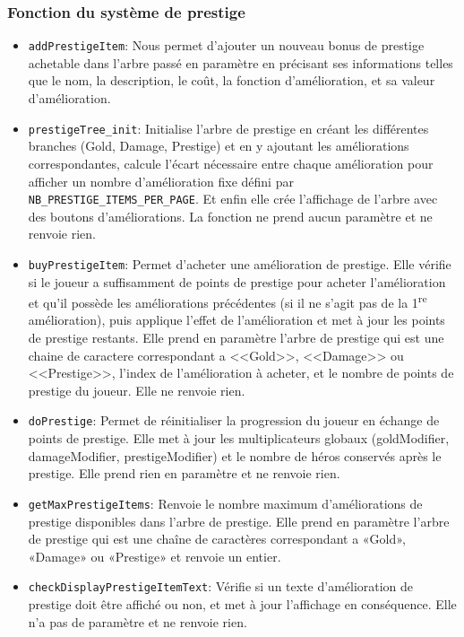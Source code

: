 \documentclass[11pt,a4paper]{article}
\begin{document}
\subsubsection{Fonction du système de prestige}
\begin{itemize}
    \item \texttt{addPrestigeItem}: Nous permet d’ajouter un nouveau bonus de prestige achetable dans l’arbre passé en paramètre en précisant ses informations telles que le nom, la description, le coût, la fonction d’amélioration, et sa valeur d’amélioration.
    \item \texttt{prestigeTree\_init}: Initialise l'arbre de prestige en créant les différentes branches (Gold, Damage, Prestige) et en y ajoutant les améliorations correspondantes, calcule l'écart nécessaire entre chaque amélioration pour afficher un nombre d'amélioration fixe défini par \\\texttt{NB\_PRESTIGE\_ITEMS\_PER\_PAGE}. Et enfin elle crée l’affichage de l’arbre avec des boutons d’améliorations. La fonction ne prend aucun paramètre et ne renvoie rien.
    \item \texttt{buyPrestigeItem}: Permet d'acheter une amélioration de prestige. Elle vérifie si le joueur a suffisamment de points de prestige pour acheter l'amélioration et qu'il possède les améliorations précédentes (si il ne s’agit pas de la 1\textsuperscript{re} amélioration), puis applique l'effet de l'amélioration et met à jour les points de prestige restants. Elle prend en paramètre l'arbre de prestige qui est une chaine de caractere correspondant a <<Gold>>, <<Damage>> ou <<Prestige>>, l'index de l'amélioration à acheter, et le nombre de points de prestige du joueur. Elle ne renvoie rien.
    \item \texttt{doPrestige}: Permet de réinitialiser la progression du joueur en échange de points de prestige. Elle met à jour les multiplicateurs globaux (goldModifier, damageModifier, prestigeModifier) et le nombre de héros conservés après le prestige. Elle prend rien en paramètre et ne renvoie rien.
    \item \texttt{getMaxPrestigeItems}: Renvoie le nombre maximum d'améliorations de prestige disponibles dans l'arbre de prestige. Elle prend en paramètre l'arbre de prestige qui est une chaîne de caractères correspondant a «Gold», «Damage» ou «Prestige» et renvoie un entier.
    \item \texttt{checkDisplayPrestigeItemText}: Vérifie si un texte d'amélioration de prestige doit être affiché ou non, et met à jour l'affichage en conséquence. Elle n'a pas de paramètre et ne renvoie rien.
\end{itemize}
\end{document}
